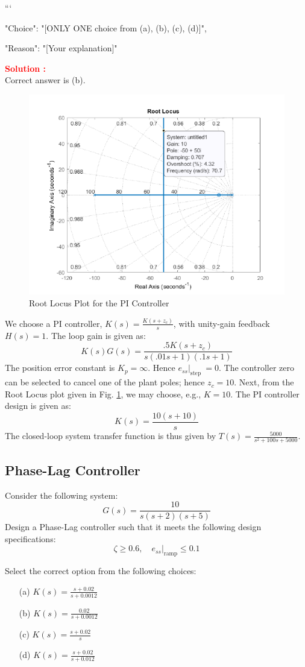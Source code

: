 \documentclass[12pt]{article}
\begin{document}
```
{

"Choice": "[ONLY ONE choice from (a), (b), (c), (d)]",

"Reason": "[Your explanation]"

}


\textbf{\textcolor{red}{Solution :}} \\
Correct answer is (b).\\
 \begin{figure}[h!]
     \centering
     \includegraphics[width=0.75\linewidth]{figs/7.4.png}
     \caption{Root Locus Plot for the PI Controller}
     \label{fig:prb19}
 \end{figure}
We choose a PI controller, $K(s)=\frac{K\left(s+z_c\right)}{s}$, with unity-gain feedback $H(s)=1$. The loop gain is given as: 
$$K(s) G(s)=\frac{.5 K\left(s+z_c\right)}{s(.01 s+1)(.1 s+1)}$$
The position error constant is $K_p=\infty$. Hence $\left.e_{s s}\right|_{\text {step }}=0$.
The controller zero can be selected to cancel one of the plant poles; hence $z_c=10$. Next, from the Root Locus plot given in Fig. \ref{fig:prb19}, we may choose, e.g., $K=10$. The PI controller design is given as: $$K(s)=\frac{10(s+10)}{s}$$
The closed-loop system transfer function is thus given by $T(s)=\frac{5000}{s^2+100 s+5000}$. 
\clearpage

\subsection{Phase-Lag Controller}

Consider the following system:
$$G(s)=\frac{10}{s(s+2)(s+5)}$$ 
Design a Phase-Lag controller such that it meets the following design specifications: 
$$\zeta \geq 0.6,\left.\quad e_{s s}\right|_{\mathrm{ramp}} \leq 0.1$$

Select the correct option from the following choices:
\begin{enumerate}
    \item [(a)] $K(s)=\frac{s+0.02}{s+0.0012}$
    \item [(b)] $K(s)=\frac{0.02}{s+0.0012}$
    \item [(c)] $K(s)=\frac{s+0.02}{s}$
    \item [(d)] $K(s)=\frac{s+0.02}{s+0.012}$
\end{enumerate}
\end{document}
